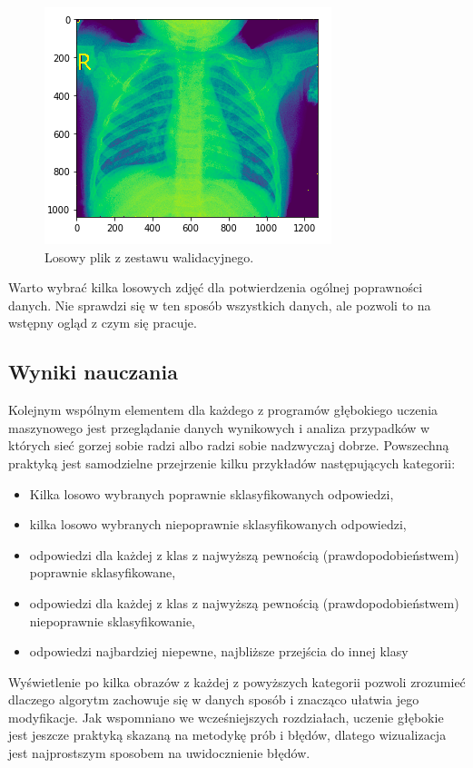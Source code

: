 \documentclass[12pt,a4paper,twoside,titlepage,openright]{book}
\begin{document}
\begin{figure}[ht]
	\centering
			\includegraphics[resolution=100, scale=0.7]{ExampleLungImage.png}
		\caption{Losowy plik z zestawu walidacyjnego.}
\end{figure}

Warto wybrać kilka losowych zdjęć dla potwierdzenia ogólnej poprawności danych. Nie sprawdzi się w ten sposób wszystkich danych, ale pozwoli to na wstępny ogląd z czym się pracuje.

\subsection{Wyniki nauczania}
Kolejnym wspólnym elementem dla każdego z programów głębokiego uczenia maszynowego jest przeglądanie danych wynikowych i analiza przypadków w których sieć gorzej sobie radzi albo radzi sobie nadzwyczaj dobrze. Powszechną praktyką jest samodzielne przejrzenie kilku przykładów następujących kategorii:
\begin{itemize}
\item Kilka losowo wybranych poprawnie sklasyfikowanych odpowiedzi,
\item kilka losowo wybranych niepoprawnie sklasyfikowanych odpowiedzi,
\item odpowiedzi dla każdej z klas z najwyższą pewnością (prawdopodobieństwem) poprawnie sklasyfikowane,
\item odpowiedzi dla każdej z klas z najwyższą pewnością (prawdopodobieństwem) niepoprawnie sklasyfikowanie,
\item odpowiedzi najbardziej niepewne, najbliższe przejścia do innej klasy
\end{itemize}
Wyświetlenie po kilka obrazów z każdej z powyższych kategorii pozwoli zrozumieć dlaczego algorytm zachowuje się w danych sposób i znacząco ułatwia jego modyfikacje. Jak wspomniano we wcześniejszych rozdziałach, uczenie głębokie jest jeszcze praktyką skazaną na metodykę prób i błędów, dlatego wizualizacja jest najprostszym sposobem na uwidocznienie błędów.
\end{document}
